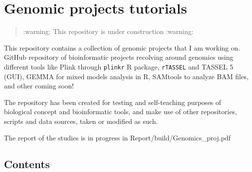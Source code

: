 \documentclass[a4paper,10pt]{article}
\begin{document}
\hypertarget{genomic-projects-tutorials}{%
  \section{Genomic projects tutorials}\label{genomic-projects-tutorials}}

\begin{quote}
  :warning: This repository is under construction :warning:
\end{quote}

This repository contains a collection of genomic projects that I am
working on. GitHub repository of bioinformatic projects recolving around
genomics using different tools like Plink through \texttt{plinkr} R
package, \texttt{rTASSEL} and TASSEL 5 (GUI), GEMMA for mixed models
analysis in R, SAMtools to analyze BAM files, and other coming soon!

The repository has been created for testing and self-teaching purposes
of biological concept and bioinformatic tools, and make use of other
repositories, scripts and data sources, taken or modified as such.

The report of the studies is in progress in
Report/build/Genomics\_proj.pdf

\hypertarget{contents}{%
  \subsection{Contents}\label{contents}}
\end{document}
